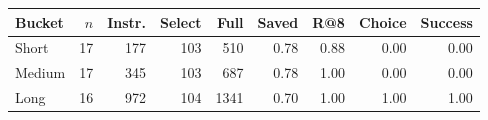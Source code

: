 \begin{tabular}{lrrrrrrrr}
\toprule
Bucket & $n$ & Instr. & Select & Full & Saved & R@8 & Choice & Success \\
\midrule
Short & 17 & 177 & 103 & 510 & 0.78 & 0.88 & 0.00 & 0.00 \\
Medium & 17 & 345 & 103 & 687 & 0.78 & 1.00 & 0.00 & 0.00 \\
Long & 16 & 972 & 104 & 1341 & 0.70 & 1.00 & 1.00 & 1.00 \\
\bottomrule
\end{tabular}
